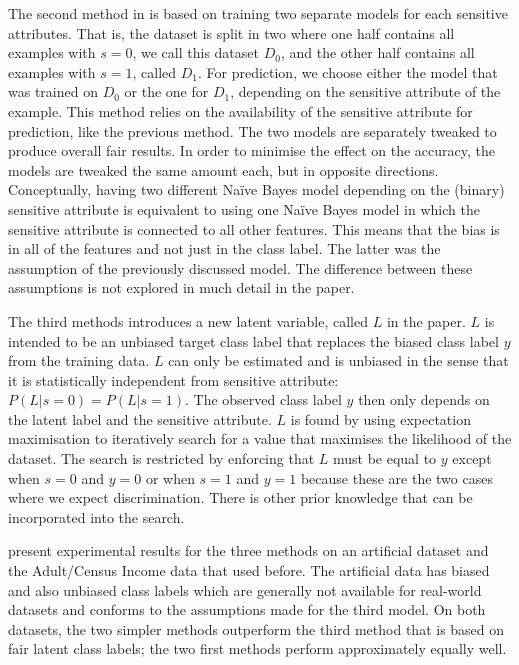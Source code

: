 The second method in \citet{calders2010three}
is based on training two separate models for each sensitive attributes.
That is, the dataset is split in two
where one half contains all examples with \(s=0\), we call this dataset \(D_0\),
and the other half contains all examples with \(s=1\), called \(D_1\).
For prediction, we choose either the model that was trained on \(D_0\) or the one for \(D_1\),
depending on the sensitive attribute of the example.
This method relies on the availability of the sensitive attribute for prediction,
like the previous method.
The two models are separately tweaked to produce overall fair results.
In order to minimise the effect on the accuracy, the models are tweaked the same amount each,
but in opposite directions.
Conceptually, having two different Na\"ive Bayes model depending on the (binary) sensitive attribute
is equivalent to using one Na\"ive Bayes model
in which the sensitive attribute is connected to all other features.
This means that the bias is in all of the features and not just in the class label.
The latter was the assumption of the previously discussed model.
The difference between these assumptions is not explored in much detail in the paper.

The third methods introduces a new latent variable, called \(L\) in the paper.
\(L\) is intended to be an unbiased target class label
that replaces the biased class label \(y\) from the training data.
\(L\) can only be estimated and is unbiased
in the sense that it is statistically independent from sensitive attribute: \(P(L|s=0) = P(L|s=1)\).
The observed class label \(y\) then only depends on the latent label and the sensitive attribute.
\(L\) is found by using expectation maximisation
to iteratively search for a value that maximises the likelihood of the dataset.
The search is restricted by enforcing that \(L\) must be equal to \(y\) except
when \(s=0\) and \(y=0\) or when \(s=1\) and \(y=1\)
because these are the two cases where we expect discrimination.
There is other prior knowledge that can be incorporated into the search.

\citet{calders2010three} present experimental results for the three methods on an artificial dataset
and the Adult/Census Income data that \citet{calders2009building} used before.
The artificial data has biased and also unbiased class labels
which are generally not available for real-world datasets
and conforms to the assumptions made for the third model.
On both datasets, the two simpler methods outperform the third method
that is based on fair latent class labels;
the two first methods perform approximately equally well.

